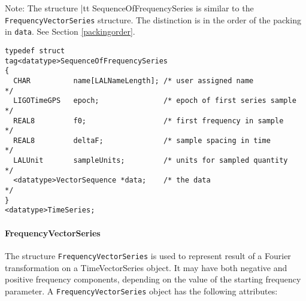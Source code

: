 \documentclass[]{ligodcc}
\renewcommand{\texttt}[1]{{\ttfamily\color{blue}#1}}
\begin{document}
Note: The structure {|tt SequenceOfFrequencySeries} is similar to the
{\tt FrequencyVectorSeries} structure. The distinction is in the order of
the packing in {\tt *data}. See Section \ref{packingorder}.

{\footnotesize
\begin{verbatim}
typedef struct
tag<datatype>SequenceOfFrequencySeries
{
  CHAR          name[LALNameLength]; /* user assigned name           */
  LIGOTimeGPS   epoch;               /* epoch of first series sample */
  REAL8         f0;                  /* first frequency in sample    */
  REAL8         deltaF;              /* sample spacing in time       */
  LALUnit       sampleUnits;         /* units for sampled quantity   */
  <datatype>VectorSequence *data;    /* the data                     */
}
<datatype>TimeSeries;
\end{verbatim}}


\paragraph{{\texttt {FrequencyVectorSeries}} \\}


The structure {\tt FrequencyVectorSeries} is used to represent result of a
Fourier transformation on a TimeVectorSeries object. It may have both
negative and positive frequency components, depending on the value
of the starting frequency parameter. A {\tt FrequencyVectorSeries} object
has the following attributes:
\end{document}
